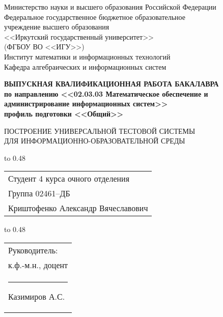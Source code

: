 \thispagestyle{empty}
\begin{center}
	Министерство науки и высшего образования Российской Федерации\\
	Федеральное государственное бюджетное образовательное\\
	учреждение высшего образования\\
	<<Иркутский государственный университет>>\\
	(ФГБОУ ВО <<ИГУ>>)\\
	Институт математики и информационных технологий\\
	Кафедра алгебраических и информационных систем\\
\end{center}

\vspace{2.7cm}

\begin{center}
	{\bf 
		ВЫПУСКНАЯ КВАЛИФИКАЦИОННАЯ РАБОТА
		БАКАЛАВРА\\[1mm]
		по направлению <<02.03.03 Математическое обеспечение и  \\[1mm] 
		администрирование информационных систем>>\\[1mm]
		профиль подготовки <<Общий>>
	}  
	
	\vspace{0.9cm}
	
	{
		ПОСТРОЕНИЕ УНИВЕРСАЛЬНОЙ 
		ТЕСТОВОЙ СИСТЕМЫ\\[1mm]
		ДЛЯ ИНФОРМАЦИОННО-ОБРАЗОВАТЕЛЬНОЙ СРЕДЫ 
	} %
\end{center}

\vspace{1.1cm}

{
	\noindent\hbox to 0.48\textwidth {%
		\mbox{ } \hfil} %
	\begin{tabular}[t]{l}
		Студент 4 курса очного отделения\\
		Группа 02461--ДБ\\
		Криштофенко Александр
		Вячеславович		
	\end{tabular}		
}

\vspace{0.8cm}

{
	\noindent\hbox to 0.48\textwidth {%
		\mbox{ } \hfil} %
	\begin{tabular}[t]{l}
		Руководитель:\\ к.ф.-м.н., доцент\\
		\rule{2.7cm}{0.5pt} Казимиров А.С.		
	\end{tabular}		
}

